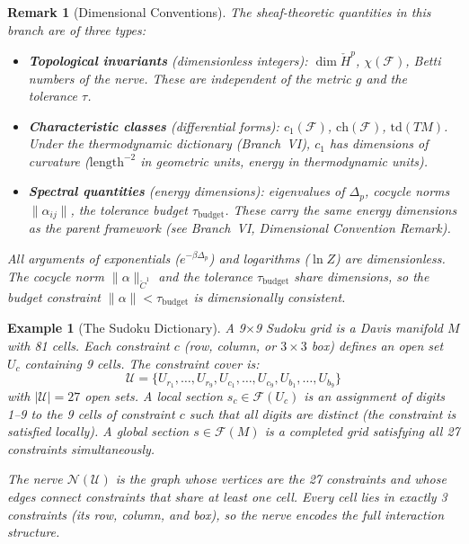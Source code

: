 \documentclass[11pt,letterpaper]{article}
\newtheorem{example}[conjecture]{Example}
\newtheorem{remark}[conjecture]{Remark}
\newcommand{\tbudget}{\tau_{\mathrm{budget}}}
\newcommand{\Cech}{\check{C}}
\newcommand{\Hcech}{\check{H}}
\newcommand{\sheaf}{\mathcal{F}}
\newcommand{\cover}{\mathcal{U}}
\newcommand{\nerve}{\mathcal{N}}
\begin{document}
\begin{remark}[Dimensional Conventions]\label{rem:dimensions}
The sheaf-theoretic quantities in this branch are of three types:
\begin{itemize}
    \item \textbf{Topological invariants} (dimensionless integers): 
    $\dim \Hcech^p$, $\chi(\sheaf)$, Betti numbers of the nerve. 
    These are independent of the metric $g$ and the tolerance $\tau$.
    \item \textbf{Characteristic classes} (differential forms): 
    $c_1(\sheaf)$, $\mathrm{ch}(\sheaf)$, $\mathrm{td}(TM)$. Under 
    the thermodynamic dictionary (Branch~VI), $c_1$ has dimensions 
    of curvature ($\mathrm{length}^{-2}$ in geometric units, 
    energy in thermodynamic units).
    \item \textbf{Spectral quantities} (energy dimensions): 
    eigenvalues of $\Delta_p$, cocycle norms $\|\alpha_{ij}\|$, 
    the tolerance budget $\tbudget$. These carry the same energy 
    dimensions as the parent framework (see Branch~VI, 
    Dimensional Convention Remark).
\end{itemize}
All arguments of exponentials ($e^{-\beta \Delta_p}$) and logarithms 
($\ln Z$) are dimensionless. The cocycle norm $\|\alpha\|_{\Cech^1}$ 
and the tolerance $\tbudget$ share dimensions, so the budget 
constraint $\|\alpha\| < \tbudget$ is dimensionally consistent.
\end{remark}

\begin{example}[The Sudoku Dictionary]\label{ex:sudoku_dict}
A 9$\times$9 Sudoku grid is a Davis manifold $M$ with 81 cells. Each 
constraint $c$ (row, column, or $3 \times 3$ box) defines an open set 
$U_c$ containing 9 cells. The constraint cover is:
\[
    \cover = \{U_{r_1}, \ldots, U_{r_9}, U_{c_1}, \ldots, U_{c_9}, 
    U_{b_1}, \ldots, U_{b_9}\}
\]
with $|\cover| = 27$ open sets. A local section $s_c \in \sheaf(U_c)$ 
is an assignment of digits 1--9 to the 9 cells of constraint $c$ such 
that all digits are distinct (the constraint is satisfied locally). A 
global section $s \in \sheaf(M)$ is a completed grid satisfying all 27 
constraints simultaneously.

The nerve $\nerve(\cover)$ is the graph whose vertices are the 27 
constraints and whose edges connect constraints that share at least one 
cell. Every cell lies in exactly 3 constraints (its row, column, and 
box), so the nerve encodes the full interaction structure.
\end{example}
\end{document}
